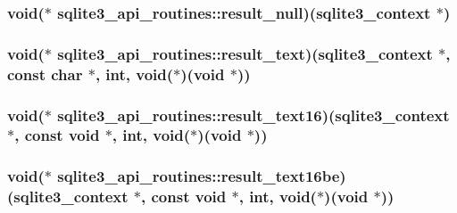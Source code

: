 \hypertarget{structsqlite3__api__routines_a00666e8dbc927015e5885d8397fe87b5}{
\subsubsection[{result\-\_\-null}]{\setlength{\rightskip}{0pt plus 5cm}void($\ast$ sqlite3\-\_\-api\-\_\-routines\-::result\-\_\-null)({\bf sqlite3\-\_\-context} $\ast$)}}\label{structsqlite3__api__routines_a00666e8dbc927015e5885d8397fe87b5}
\hypertarget{structsqlite3__api__routines_aab7d23eb300244a843b8b88f07253b17}{
\subsubsection[{result\-\_\-text}]{\setlength{\rightskip}{0pt plus 5cm}void($\ast$ sqlite3\-\_\-api\-\_\-routines\-::result\-\_\-text)({\bf sqlite3\-\_\-context} $\ast$, const char $\ast$, int, void($\ast$)(void $\ast$))}}\label{structsqlite3__api__routines_aab7d23eb300244a843b8b88f07253b17}
\hypertarget{structsqlite3__api__routines_a65aabe03e23304ceb885829bf2393aa5}{
\subsubsection[{result\-\_\-text16}]{\setlength{\rightskip}{0pt plus 5cm}void($\ast$ sqlite3\-\_\-api\-\_\-routines\-::result\-\_\-text16)({\bf sqlite3\-\_\-context} $\ast$, const void $\ast$, int, void($\ast$)(void $\ast$))}}\label{structsqlite3__api__routines_a65aabe03e23304ceb885829bf2393aa5}
\hypertarget{structsqlite3__api__routines_a328415dd9961d9e0d6b15a76fe134b9d}{
\subsubsection[{result\-\_\-text16be}]{\setlength{\rightskip}{0pt plus 5cm}void($\ast$ sqlite3\-\_\-api\-\_\-routines\-::result\-\_\-text16be)({\bf sqlite3\-\_\-context} $\ast$, const void $\ast$, int, void($\ast$)(void $\ast$))}}\label{structsqlite3__api__routines_a328415dd9961d9e0d6b15a76fe134b9d}
